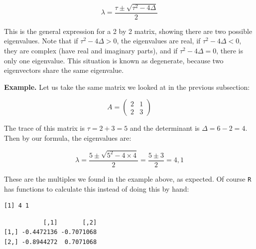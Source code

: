 \documentclass[
  letterpaper,
  DIV=11,
  numbers=noendperiod]{scrreprt}
\newenvironment{Shaded}{\begin{snugshade}}{\end{snugshade}}
\newcommand{\AttributeTok}[1]{\textcolor[rgb]{0.40,0.45,0.13}{#1}}
\newcommand{\DecValTok}[1]{\textcolor[rgb]{0.68,0.00,0.00}{#1}}
\newcommand{\FunctionTok}[1]{\textcolor[rgb]{0.28,0.35,0.67}{#1}}
\newcommand{\NormalTok}[1]{\textcolor[rgb]{0.00,0.23,0.31}{#1}}
\newcommand{\OtherTok}[1]{\textcolor[rgb]{0.00,0.23,0.31}{#1}}
\newcommand{\SpecialCharTok}[1]{\textcolor[rgb]{0.37,0.37,0.37}{#1}}
\begin{document}
\[
\lambda = \frac{\tau \pm \sqrt{\tau^2-4\Delta}}{2}
\]

This is the general expression for a 2 by 2 matrix, showing there are
two possible eigenvalues. Note that if \(\tau^2-4\Delta>0\), the
eigenvalues are real, if \(\tau^2-4\Delta<0\), they are complex (have
real and imaginary parts), and if \(\tau^2-4\Delta=0\), there is only
one eigenvalue. This situation is known as degenerate, because two
eigenvectors share the same eigenvalue.

\textbf{Example.} Let us take the same matrix we looked at in the
previous subsection:

\[
A = \left(\begin{array}{cc}2 & 1 \\ 2& 3\end{array}\right)
\]

The trace of this matrix is \(\tau = 2+3 =5\) and the determinant is
\(\Delta = 6 - 2 = 4\). Then by our formula, the eigenvalues are:

\[
\lambda = \frac{5 \pm \sqrt{5^2-4 \times 4}}{2}  =  \frac{5 \pm 3}{2}  = 4, 1
\]

These are the multiples we found in the example above, as expected. Of
course \texttt{R} has functions to calculate this instead of doing this
by hand:

\begin{Shaded}
\end{Shaded}

\begin{verbatim}
[1] 4 1
\end{verbatim}

\begin{Shaded}
\end{Shaded}

\begin{verbatim}
           [,1]       [,2]
[1,] -0.4472136 -0.7071068
[2,] -0.8944272  0.7071068
\end{verbatim}
\end{document}
